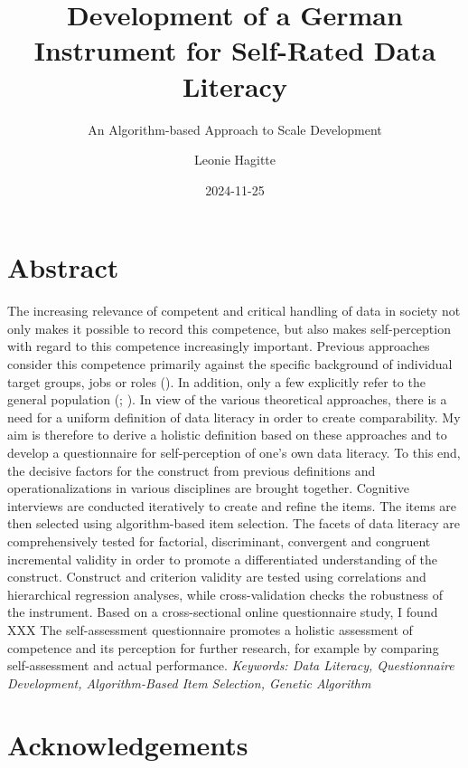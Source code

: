 \documentclass[
  12pt,
  a4paper,
  twoside]{article}
\title{Development of a German Instrument for Self-Rated Data Literacy}
\subtitle{An Algorithm-based Approach to Scale Development}
\author{Leonie Hagitte}
\date{2024-11-25}
\begin{document}
\maketitle

{
\setcounter{tocdepth}{2}
\tableofcontents
}
\newpage\null\thispagestyle{empty}\newpage

\section*{Abstract}\label{abstract}

The increasing relevance of competent and critical handling of data in society not only makes it possible to record this competence, but also makes self-perception with regard to this competence increasingly important. Previous approaches consider this competence primarily against the specific background of individual target groups, jobs or roles (). In addition, only a few explicitly refer to the general population (; ). In view of the various theoretical approaches, there is a need for a uniform definition of data literacy in order to create comparability.
My aim is therefore to derive a holistic definition based on these approaches and to develop a questionnaire for self-perception of one's own data literacy. To this end, the decisive factors for the construct from previous definitions and operationalizations in various disciplines are brought together. Cognitive interviews are conducted iteratively to create and refine the items. The items are then selected using algorithm-based item selection. The facets of data literacy are comprehensively tested for factorial, discriminant, convergent and congruent incremental validity in order to promote a differentiated understanding of the construct. Construct and criterion validity are tested using correlations and hierarchical regression analyses, while cross-validation checks the robustness of the instrument.
Based on a cross-sectional online questionnaire study, I found XXX
The self-assessment questionnaire promotes a holistic assessment of competence and its perception for further research, for example by comparing self-assessment and actual performance.
\emph{Keywords: Data Literacy, Questionnaire Development, Algorithm-Based Item Selection, Genetic Algorithm}

\section*{Acknowledgements}\label{acknowledgements}
\end{document}
